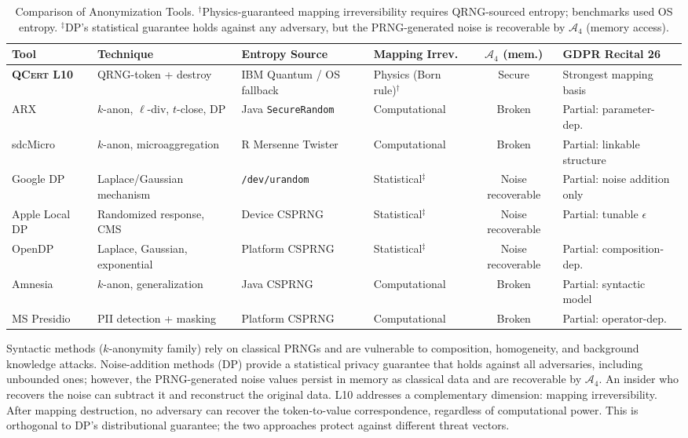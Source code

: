 \documentclass[acmsmall,screen,review,anonymous]{acmart}
\begin{document}
\begin{table}[t]
\caption{Comparison of Anonymization Tools. $^\dagger$Physics-guaranteed mapping irreversibility requires QRNG-sourced entropy; benchmarks used OS entropy. $^\ddagger$DP's statistical guarantee holds against any adversary, but the PRNG-generated noise is recoverable by $\mathcal{A}_4$ (memory access).}
\label{tab:comparison}
\begin{center}
\begin{tabular}{@{}llllcp{3.3cm}@{}}
\toprule
\textbf{Tool} & \textbf{Technique} & \textbf{Entropy Source} & \textbf{Mapping Irrev.} & \textbf{$\mathcal{A}_4$ (mem.)} & \textbf{GDPR Recital 26} \\
\midrule
\textbf{\textsc{QCert} L10} & QRNG-token + destroy & IBM Quantum / OS fallback & Physics (Born rule)$^\dagger$ & Secure & Strongest mapping basis \\
ARX~\cite{prasser2014arx} & $k$-anon, $\ell$-div, $t$-close, DP & Java \texttt{SecureRandom} & Computational & Broken & Partial: parameter-dep.\ \\
sdcMicro~\cite{templ2017sdc} & $k$-anon, microaggregation & R Mersenne Twister & Computational & Broken & Partial: linkable structure \\
Google DP~\cite{wilson2020dpsql} & Laplace/Gaussian mechanism & \texttt{/dev/urandom} & Statistical$^\ddagger$ & Noise recoverable & Partial: noise addition only \\
Apple Local DP~\cite{apple2017dp} & Randomized response, CMS & Device CSPRNG & Statistical$^\ddagger$ & Noise recoverable & Partial: tunable $\epsilon$ \\
OpenDP~\cite{gaboardi2016psi} & Laplace, Gaussian, exponential & Platform CSPRNG & Statistical$^\ddagger$ & Noise recoverable & Partial: composition-dep.\ \\
Amnesia~\cite{elemam2008kanon} & $k$-anon, generalization & Java CSPRNG & Computational & Broken & Partial: syntactic model \\
MS Presidio & PII detection + masking & Platform CSPRNG & Computational & Broken & Partial: operator-dep.\ \\
\bottomrule
\end{tabular}
\end{center}
\end{table}

Syntactic methods ($k$-anonymity family) rely on classical PRNGs and are vulnerable to composition, homogeneity, and background knowledge attacks. Noise-addition methods (DP) provide a statistical privacy guarantee that holds against all adversaries, including unbounded ones; however, the PRNG-generated noise values persist in memory as classical data and are recoverable by $\mathcal{A}_4$. An insider who recovers the noise can subtract it and reconstruct the original data. L10 addresses a complementary dimension: mapping irreversibility. After mapping destruction, no adversary can recover the token-to-value correspondence, regardless of computational power. This is orthogonal to DP's distributional guarantee; the two approaches protect against different threat vectors.
\end{document}
